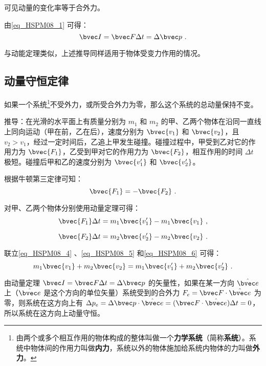可见动量的变化率等于合外力。

由\autoref{eq_HSPM08_1} 可得：
\begin{equation}\label{eq_HSPM08_3}
\bvec I=\bvec F\Delta t=\Delta \bvec p~.
\end{equation}

与动能定理类似，上述推导同样适用于物体受变力作用的情况。

\subsection{动量守恒定律}

如果一个系统\footnote{由两个或多个相互作用的物体构成的整体叫做一个\textbf{力学系统}（简称\textbf{系统}）。系统中物体间的作用力叫做\textbf{内力}，系统以外的物体施加给系统内物体的力叫做\textbf{外力}。}不受外力，或所受合外力为零，那么这个系统的总动量保持不变。

推导：在光滑的水平面上有质量分别为 $m_1$ 和 $m_2$ 的甲、乙两个物体在沿同一直线上同向运动（甲在前，乙在后），速度分别为 $\bvec{v_1}$ 和 $\bvec{v_2}$，且 $v_2>v_1$，经过一定时间后，乙追上甲发生碰撞。碰撞过程中，甲受到乙对它的作用力为 $\bvec {F_1}$，乙受到甲对它的作用力为 $\bvec {F_2}$，相互作用的时间 $\Delta t$ 极短。碰撞后甲和乙的速度分别为 $\bvec{v_1'}$ 和 $\bvec{v_2'}$。

根据牛顿第三定律可知：
\begin{equation}\label{eq_HSPM08_4}
\bvec {F_1}=-\bvec{F_2}~.
\end{equation}

对甲、乙两个物体分别使用动量定理可得：
\begin{equation}\label{eq_HSPM08_5}
\bvec{F_1}\Delta t=m_1\bvec{v_1'}-m_1\bvec{v_1}~,
\end{equation}

\begin{equation}\label{eq_HSPM08_6}
\bvec{F_2}\Delta t=m_2\bvec{v_2'}-m_2\bvec{v_2}~.
\end{equation}

联立\autoref{eq_HSPM08_4} 、\autoref{eq_HSPM08_5} 和\autoref{eq_HSPM08_6} 可得：
\begin{equation}
m_1\bvec{v_1}+ m_2\bvec{v_2}= m_1\bvec{v_1'}+ m_2\bvec{v_2'}~.
\end{equation}

由动量定理 $\bvec I = \bvec F \Delta t = \Delta \bvec p$ 的矢量性，如果在某一方向 $\hat{\bvec e}$ 上（$\hat{\bvec e}$ 是这个方向的单位矢量）系统受到的合外力 $F_{e} = \bvec F \cdot \hat{\bvec e}$ 为零，则系统在这方向上有 $\Delta p_{e} = \Delta \bvec p \cdot \hat{\bvec e} = (\bvec F \cdot \hat{\bvec e}) \Delta t = 0$，所以系统在这方向上动量守恒。


